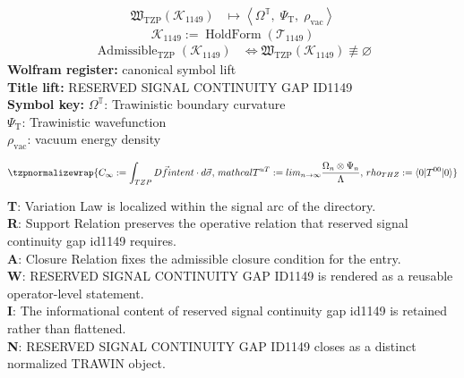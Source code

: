 \noindent
\begin{minipage}[t]{0.48\linewidth}
\begingroup
\small
\[
\begin{aligned}
\mathfrak{W}_{\mathrm{TZP}}\!\left(\mathcal{K}_{1149}\right)
&\longmapsto
\left\langle \Omega^{\mathbb{T}},\; \Psi_{\mathrm{T}},\; \rho_{\mathrm{vac}} \right\rangle
\end{aligned}
\]
\[
\mathcal{K}_{1149}
:=
\operatorname{HoldForm}\!\left(\mathcal{T}_{1149}\right)
\]
\[
\begin{aligned}
\operatorname{Admissible}_{\mathrm{TZP}}\!\left(\mathcal{K}_{1149}\right)
&\Longleftrightarrow
\mathfrak{W}_{\mathrm{TZP}}\!\left(\mathcal{K}_{1149}\right)\not\equiv\varnothing
\end{aligned}
\]
\textbf{Wolfram register:} canonical symbol lift\\
\textbf{Title lift:} RESERVED SIGNAL CONTINUITY GAP ID1149\\
\textbf{Symbol key:} \(\Omega^{\mathbb{T}}\): Trawinistic boundary curvature\\ \(\Psi_{\mathrm{T}}\): Trawinistic wavefunction\\ \(\rho_{\mathrm{vac}}\): vacuum energy density
\par
\endgroup
\end{minipage}\hfill
\begin{minipage}[t]{0.48\linewidth}
\[
\tzpnormalizewrap{C_{\infty} := \int_{TZP} D \vec{f} {intent} \cdot d\vec{\sigma},\,mathcal{T}^{uT}:=lim_{n\rightarrow\infty}\frac{\Omega_{n}\otimes\Psi_{n}}{\Lambda},\,rho_{THZ}:=\langle0|T^{00}|0\rangle}
\]

\small
\textbf{T}: Variation Law is localized within the signal arc of the directory.\\
\textbf{R}: Support Relation preserves the operative relation that reserved signal continuity gap id1149 requires.\\
\textbf{A}: Closure Relation fixes the admissible closure condition for the entry.\\
\textbf{W}: RESERVED SIGNAL CONTINUITY GAP ID1149 is rendered as a reusable operator-level statement.\\
\textbf{I}: The informational content of reserved signal continuity gap id1149 is retained rather than flattened.\\
\textbf{N}: RESERVED SIGNAL CONTINUITY GAP ID1149 closes as a distinct normalized TRAWIN object.
\normalsize
\end{minipage}

